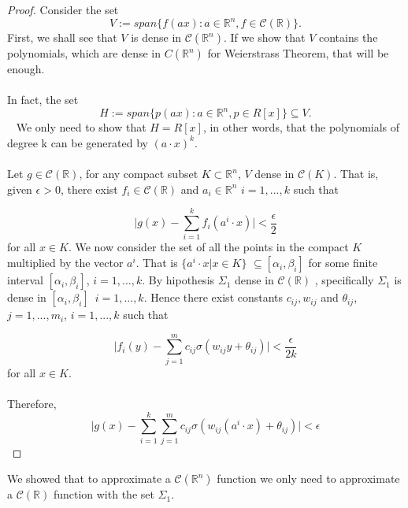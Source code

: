 \documentclass[../main.tex]{subfiles}
\begin{document}
	\begin{proof} %
			Consider the set $$V:= span\{ f(ax) : a \in \mathbb{R}^n, f \in \mathcal{C}(\mathbb{R}) \}.$$ First, we shall see that $V$ is dense in $\mathcal{C}(\mathbb{R}^n)$.  If we show that $V$ contains the polynomials, which are dense in $C(\mathbb{R}^n)$ for Weierstrass Theorem, that will be enough. \\ \\ 
			In fact, the set $$ H := span\{ p(ax) : a \in \mathbb{R}^n, p \in R[x] \} \subseteq V.$$ 
			We only need to show that $H=R[x]$, in other words, that the polynomials of degree k can be generated by $(a\cdot x)^k$.  \\ \\ 
		
			Let $g\in \mathcal{C}(\mathbb{R}) $, for any compact subset $K \subset \mathbb{R}^n  $, $V$ dense in $\mathcal{C}(K)$. That is, given $\epsilon >0$, there exist $f_i\in  \mathcal{C}(\mathbb{R})$ and $a_i \in \mathbb{R}^n $    {\scriptsize $i=1,...,k$}  such that
			
			$$ \big| g(x)-\sum_{i=1}^k f_i(a^i \cdot x) \big| < \frac{\epsilon}{2}$$
			for all $x\in K$. We now consider the set of all the points in the compact $K$ multiplied by the vector $a^i$. That is $\{a^i \cdot x | x \in K\}$ $\subseteq[\alpha_i,\beta_i] $ for some finite interval $[\alpha_i,\beta_i]$, $i=1,...,k$. By hipothesis $\Sigma_1 $ dense in $\mathcal{C}(\mathbb{R})$ , specifically $\Sigma_1 $ is dense in $[\alpha_i,\beta_i ]$ $ \, i=1,...,k$. Hence there exist constants $c_{ij}, w_{ij}$ and $\theta_{ij}$, $j=1,...,m_i$, $i=1,...,k$ such that 
			
			$$ \big| f_i(y) - \sum_{j=1}^{m} c_{ij} \sigma(w_{ij}y+ \theta_{ij})\big| < \frac{\epsilon}{2k}$$
			for all $x\in K$. \\ \\
			Therefore, 
			$$ \big| g(x) - \sum_{i=1}^k \sum_{j=1}^m c_{ij} \sigma(w_{ij}(a^i \cdot x) + \theta_{ij})  \big| < \epsilon$$
		\end{proof}
	\noindent We showed that to approximate a $\mathcal{C}(\mathbb{R}^n)$ function we only need to approximate a $\mathcal{C} (\mathbb{R})$ function with the set $\Sigma_1$. 
\end{document}
